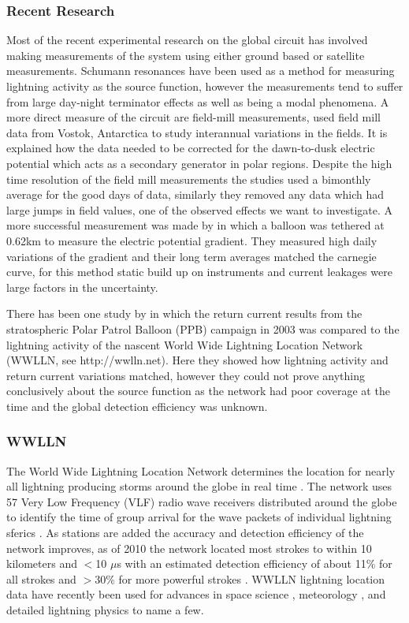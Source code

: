 \documentclass[12pt, letterpaper, onecolumn, oneside]{article}
\begin{document}
\subsubsection*{Recent Research}

Most of the recent experimental research on the global circuit has involved making measurements of the system using either ground based or satellite measurements. Schumann resonances have been used as a method for measuring lightning activity as the source function, however the measurements tend to suffer from large day-night terminator effects \citep{Price2007} as well as being a modal phenomena. A more direct measure of the circuit are field-mill measurements, \citet{Burns2005} used field mill data from Vostok, Antarctica to study interannual variations in the fields. It is explained how the data needed to be corrected for the dawn-to-dusk electric potential which acts as a secondary generator in polar regions. Despite the high time resolution of the field mill measurements the studies used a bimonthly average for the good days of data, similarly they removed any data which had large jumps in field values, one of the observed effects we want to investigate. A more successful measurement was made by \citet{Holzworth1984} in which a balloon was tethered at 0.62km to measure the electric potential gradient. They measured high daily variations of the gradient and their long term averages matched the carnegie curve, for this method static build up on instruments and current leakages were large factors in the uncertainty.

There has been one study by \citet{Holzworth2005} in which the return current results from the stratospheric Polar Patrol Balloon (PPB) campaign in 2003 was compared to the lightning activity of the nascent World Wide Lightning Location Network (WWLLN, see http://wwlln.net). Here they showed how lightning activity and return current variations matched, however they could not prove anything conclusively about the source function as the network had poor coverage at the time and the global detection efficiency was unknown.

\subsubsection*{WWLLN}

The World Wide Lightning Location Network determines the location for nearly all lightning producing storms around the globe in real time \citep{Jacobson2006c}. The network uses 57 Very Low Frequency (VLF) radio wave receivers distributed around the globe to identify the time of group arrival  for the wave packets of individual lightning sferics \citep{Dowden2002d}. As stations are added the accuracy and detection efficiency of the network improves, as of 2010 the network located most strokes to within 10 kilometers and $<$10 $\mu$s with an estimated detection efficiency of about 11\% for all strokes and $>$30\% for more powerful strokes \citep{Abarca2010,Rodger2009}. WWLLN lightning location data have recently been used for advances in space science \citep{Kumar2009,Holzworth2011}, meteorology \citep{Price2009,Thomas2010d}, and detailed lightning physics \citep{Connaughton2010a} to name a few. 
\end{document}
